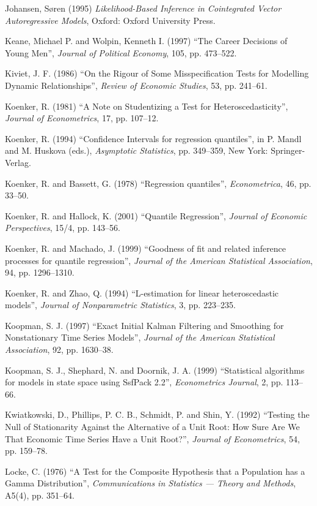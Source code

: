 \begin{thebibliography}
  Johansen, S\o{}ren (1995) \emph{Likelihood-Based Inference in
    Cointegrated Vector Autoregressive Models}, Oxford: Oxford
  University Press.

  Keane, Michael P. and Wolpin, Kenneth I. (1997) ``The Career
  Decisions of Young Men'', \emph{Journal of Political Economy}, 105,
  pp. 473--522.

  Kiviet, J. F. (1986) ``On the Rigour of Some Misspecification Tests
  for Modelling Dynamic Relationships'', \emph{Review of Economic
    Studies}, 53, pp. 241--61.

  Koenker, R. (1981) ``A Note on Studentizing a Test for
  Heteroscedasticity'', \emph{Journal of Econometrics}, 17,
  pp. 107--12.

  Koenker, R. (1994) ``Confidence Intervals for regression
  quantiles'', in P. Mandl and M. Huskova (eds.), \emph{Asymptotic
    Statistics}, pp. 349--359, New York: Springer-Verlag.

  Koenker, R. and Bassett, G. (1978) ``Regression quantiles'',
  \emph{Econometrica}, 46, pp. 33--50.

  Koenker, R. and Hallock, K. (2001) ``Quantile Regression'',
  \emph{Journal of Economic Perspectives}, 15/4, pp. 143--56.

  Koenker, R. and Machado, J. (1999) ``Goodness of fit and related
  inference processes for quantile regression'', \emph{Journal of the
    American Statistical Association}, 94, pp. 1296--1310.

  Koenker, R. and Zhao, Q. (1994) ``L-estimation for linear
  heteroscedastic models'', \emph{Journal of Nonparametric
    Statistics}, 3, pp. 223--235.

  Koopman, S. J. (1997) ``Exact Initial Kalman Filtering and
  Smoothing for Nonstationary Time Series Models'', \emph{Journal of
    the American Statistical Association}, 92, pp. 1630--38.

  Koopman, S. J., Shephard, N. and Doornik, J. A. (1999) 
  ``Statistical algorithms for models in state space using SsfPack
  2.2'', \emph{Econometrics Journal}, 2, pp. 113--66.

  Kwiatkowski, D., Phillips, P. C. B., Schmidt, P. and Shin, Y. (1992)
  ``Testing the Null of Stationarity Against the Alternative of a Unit
  Root: How Sure Are We That Economic Time Series Have a Unit Root?'',
  \emph{Journal of Econometrics}, 54, pp. 159--78.

  Locke, C. (1976) ``A Test for the Composite Hypothesis that a
  Population has a Gamma Distribution'', \emph{Communications in
    Statistics --- Theory and Methods}, A5(4), pp. 351--64.
  

\end{thebibliography}
